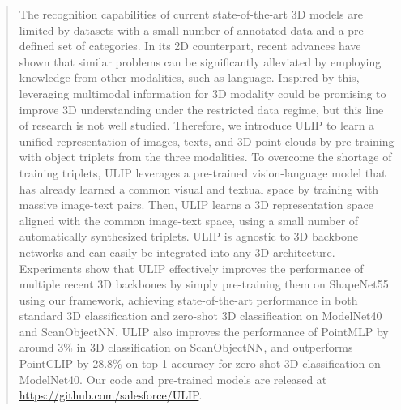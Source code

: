 \documentclass[10pt,twocolumn,letterpaper]{article}
\makeatletter
\newcommand{\jw}[1]{\textcolor{Bittersweet}{[Jiajun\@: #1]}}
\makeatother
\begin{document}
\begin{abstract}
The recognition capabilities of current state-of-the-art 3D models are limited by datasets with a small number of annotated data and a pre-defined set of categories.
In its 2D counterpart, recent advances have shown that similar problems can be significantly alleviated by employing knowledge from other modalities, such as language.
Inspired by this, leveraging multimodal information for 3D modality could be promising to improve 3D understanding under the restricted data regime, but this line of research is not well studied.
Therefore, we introduce ULIP to learn a unified representation of images, texts, and 3D point clouds by pre-training with object triplets from the three modalities.
To overcome the shortage of training triplets, ULIP leverages a pre-trained vision-language model that has already learned a common visual and textual space by training with massive image-text pairs. Then, ULIP learns a 3D representation space aligned with the common image-text space, using a small number of automatically synthesized triplets.
ULIP is agnostic to 3D backbone networks and can easily be integrated into any 3D architecture.
Experiments show that ULIP effectively improves the performance of multiple recent 3D backbones by simply pre-training them on ShapeNet55 using our framework, achieving state-of-the-art performance in both standard 3D classification and zero-shot 3D classification on ModelNet40 and ScanObjectNN. ULIP also improves the performance of PointMLP by around 3\% in 3D classification on ScanObjectNN, and outperforms PointCLIP by 28.8\% on top-1 accuracy for zero-shot 3D classification on ModelNet40. Our code and pre-trained models are released at \href{https://github.com/salesforce/ULIP}{https://github.com/salesforce/ULIP}.
\end{abstract}
\end{document}
